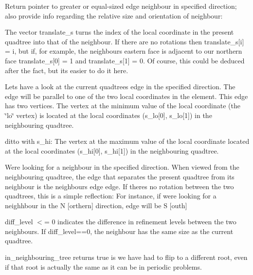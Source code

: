 Return pointer to greater or equal-\/sized edge neighbour in specified {\ttfamily direction}; also provide info regarding the relative size and orientation of neighbour\+:
\begin{DoxyItemize}
\item The vector translate\+\_\+s turns the index of the local coordinate in the present quadtree into that of the neighbour. If there are no rotations then translate\+\_\+s\mbox{[}i\mbox{]} = i, but if, for example, the neighbour\textquotesingle{}s eastern face is adjacent to our northern face translate\+\_\+s\mbox{[}0\mbox{]} = 1 and translate\+\_\+s\mbox{[}1\mbox{]} = 0. Of course, this could be deduced after the fact, but it\textquotesingle{}s easier to do it here.
\item Let\textquotesingle{}s have a look at the current quadtree\textquotesingle{}s edge in the specified direction. The edge will be parallel to one of the two local coordinates in the element. This edge has two vertices. The vertex at the minimum value of the local coordinate (the \char`\"{}lo\char`\"{} vertex) is located at the local coordinates ({\ttfamily s\+\_\+lo}\mbox{[}0\mbox{]}, {\ttfamily s\+\_\+lo}\mbox{[}1\mbox{]}) in the neighbouring quadtree.
\item ditto with s\+\_\+hi\+: The vertex at the maximum value of the local coordinate located at the local coordinates ({\ttfamily s\+\_\+hi}\mbox{[}0\mbox{]}, {\ttfamily s\+\_\+hi}\mbox{[}1\mbox{]}) in the neighbouring quadtree.
\item We\textquotesingle{}re looking for a neighbour in the specified {\ttfamily direction}. When viewed from the neighbouring quadtree, the edge that separates the present quadtree from its neighbour is the neighbour\textquotesingle{}s {\ttfamily edge} edge. If there\textquotesingle{}s no rotation between the two quadtrees, this is a simple reflection\+: For instance, if we\textquotesingle{}re looking for a neighhbour in the {\ttfamily N} \mbox{[}orthern\mbox{]} {\ttfamily direction}, {\ttfamily edge} will be {\ttfamily S} \mbox{[}outh\mbox{]}
\item {\ttfamily diff\+\_\+level} $<$= 0 indicates the difference in refinement levels between the two neighbours. If {\ttfamily diff\+\_\+level==0}, the neighbour has the same size as the current quadtree.
\item {\ttfamily in\+\_\+neighbouring\+\_\+tree} returns true is we have had to flip to a different root, even if that root is actually the same as it can be in periodic problems. 
\end{DoxyItemize}

